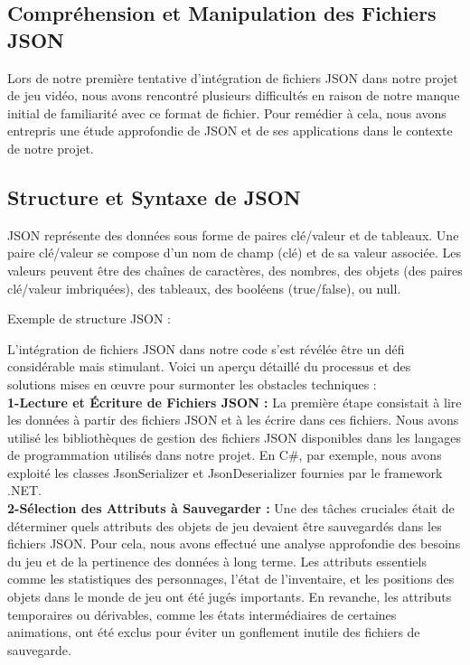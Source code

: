 \subsection*{Compréhension et Manipulation des Fichiers JSON}
Lors de notre première tentative d'intégration de fichiers JSON dans notre projet de jeu vidéo, nous avons 
rencontré plusieurs difficultés en raison de notre manque initial de familiarité avec ce format de fichier. Pour remédier à cela, 
nous avons entrepris une étude approfondie de JSON et de ses applications dans le contexte de notre projet.

\subsection*{Structure et Syntaxe de JSON}
JSON représente des données sous forme de paires clé/valeur et de tableaux. Une paire clé/valeur se compose d'un nom de champ (clé) et de sa valeur associée. 
Les valeurs peuvent être des chaînes de caractères, des nombres, des objets (des paires clé/valeur imbriquées), des tableaux, des booléens (true/false), ou null.

Exemple de structure JSON : 

L'intégration de fichiers JSON dans notre code s'est révélée être un défi considérable mais stimulant. 
Voici un aperçu détaillé du processus et des solutions mises en œuvre pour surmonter les obstacles techniques :
\\

\textbf{1-Lecture et Écriture de Fichiers JSON :}
La première étape consistait à lire les données à partir des fichiers JSON et à les écrire dans ces fichiers. 
Nous avons utilisé les bibliothèques de gestion des fichiers JSON disponibles dans les langages de programmation utilisés dans notre projet.
 En C\#, par exemple, nous avons exploité les classes JsonSerializer et JsonDeserializer fournies par le framework .NET.
\\

\textbf{2-Sélection des Attributs à Sauvegarder :}
Une des tâches cruciales était de déterminer quels attributs des objets de jeu devaient être sauvegardés dans les fichiers JSON. Pour cela, 
nous avons effectué une analyse approfondie des besoins du jeu et de la pertinence des données à long terme. Les attributs essentiels comme les
statistiques des personnages, l'état de l'inventaire, et les positions des objets dans le monde de jeu ont été jugés importants. En revanche, 
les attributs temporaires ou dérivables, comme les états intermédiaires de certaines animations, ont été exclus pour éviter un gonflement inutile des fichiers de sauvegarde.
\\

